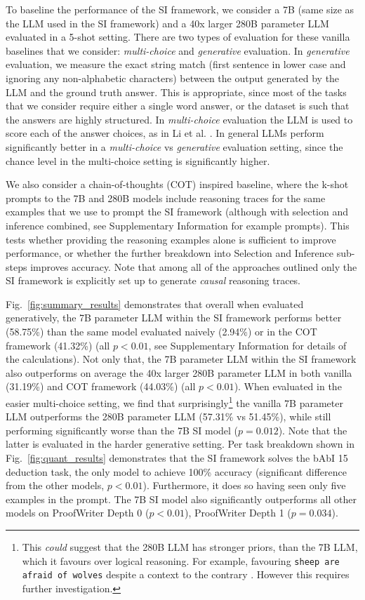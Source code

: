 To baseline the performance of the SI framework, we consider a 7B (same size as the LLM used in the SI framework) and a 40x larger 280B parameter LLM evaluated in a 5-shot setting. There are two types of evaluation for these vanilla baselines that we consider: \textit{multi-choice} and \textit{generative} evaluation. In \textit{generative} evaluation, we measure the exact string match (first sentence in lower case and ignoring any non-alphabetic characters) between the output generated by the LLM and the ground truth answer. This is appropriate, since most of the tasks that we consider require either a single word answer, or the dataset is such that the answers are highly structured. In \textit{multi-choice} evaluation the LLM is used to score each of the answer choices, as in Li et al. \citep{li2021systematic}. In general LLMs perform significantly better in a \textit{multi-choice} vs \textit{generative} evaluation setting, since the chance level in the multi-choice setting is significantly higher.

We also consider a chain-of-thoughts (COT) \citep{wei2022chain} inspired baseline, where the k-shot prompts to the 7B and 280B models include reasoning traces for the same examples that we use to prompt the SI framework (although with selection and inference combined, see Supplementary Information for example prompts). This tests whether providing the reasoning examples alone is sufficient to improve performance, or whether the further breakdown into Selection and Inference sub-steps improves accuracy. Note that among all of the approaches outlined only the SI framework is explicitly set up to generate \emph{causal} reasoning traces. 

Fig.~\ref{fig:summary_results} demonstrates that overall when evaluated generatively, the 7B parameter LLM within the SI framework performs better (58.75\%) than the same model evaluated naively (2.94\%) or in the COT framework (41.32\%) (all $p<0.01$, see Supplementary Information for details of the calculations). Not only that, the 7B parameter LLM within the SI framework also outperforms on average the 40x larger 280B parameter LLM in both vanilla (31.19\%) and COT framework (44.03\%) (all $p<0.01$). When evaluated in the easier multi-choice setting, we find that surprisingly\footnote{This \emph{could} suggest that the 280B LLM has stronger priors, than the 7B LLM, which it favours over logical reasoning. For example, favouring \texttt{sheep are afraid of wolves} despite a context to the contrary \citep{min2022rethinking}. However this requires further investigation.} the vanilla 7B parameter LLM outperforms the 280B parameter LLM (57.31\% vs 51.45\%), while still performing significantly worse than the 7B SI model ($p=0.012$). Note that the latter is evaluated in the harder generative setting. Per task breakdown shown in Fig.~\ref{fig:quant_results} demonstrates that the SI framework solves the bAbI 15 deduction task, the only model to achieve 100\% accuracy (significant difference from the other models, $p<0.01$). Furthermore, it does so having seen only five examples in the prompt. The 7B SI model also significantly outperforms all other models on ProofWriter Depth 0 ($p<0.01$), ProofWriter Depth 1 ($p=0.034$).

